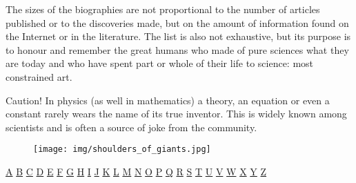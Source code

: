 The sizes of the biographies are not proportional to the number of articles published or to the discoveries made, but on the amount of information found on the Internet or in the literature. The list is also not exhaustive, but its purpose is to honour and remember the great humans who made of pure sciences what they are today and who have spent part or whole of their life to science: most constrained art.

	\begin{tcolorbox}[colback=red!5,borderline={1mm}{2mm}{red!5},arc=0mm,boxrule=0pt]
	\bcbombe Caution! In physics (as well in mathematics) a theory, an equation or even a constant rarely wears the name of its true inventor. This is widely known among scientists and is often a source of joke from the community.
	\end{tcolorbox}

	\begin{figure}[H]
		\centering
		\texttt{[image: img/shoulders\_of\_giants.jpg]}	
	\end{figure}

\begin{center}
\hyperref[sec:A]{A} \hyperref[sec:B]{B} \hyperref[sec:C]{C} \hyperref[sec:D]{D} \hyperref[sec:E]{E} \hyperref[sec:F]{F} \hyperref[sec:G]{G} \hyperref[sec:H]{H} \hyperref[sec:I]{I} \hyperref[sec:J]{J} \hyperref[sec:K]{K} \hyperref[sec:L]{L} \hyperref[sec:M]{M} \hyperref[sec:N]{N} \hyperref[sec:O]{O} \hyperref[sec:P]{P} \hyperref[sec:Q]{Q} \hyperref[sec:R]{R} \hyperref[sec:S]{S} \hyperref[sec:T]{T} \hyperref[sec:U]{U} \hyperref[sec:V]{V} \hyperref[sec:W]{W} \hyperref[sec:X]{X} \hyperref[sec:Y]{Y} \hyperref[sec:Z]{Z}
\end{center}

{}
\label{sec:A}
		
